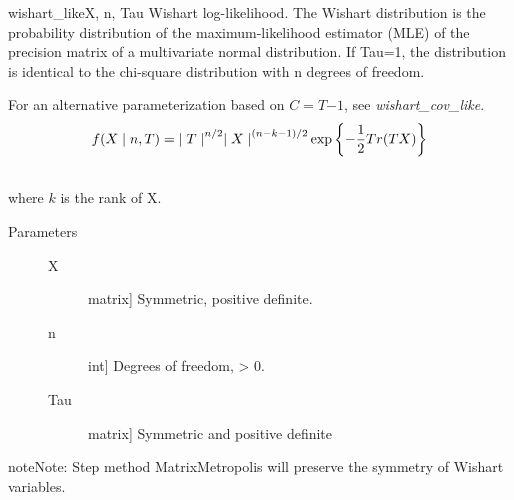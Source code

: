 \hypertarget{pymc.distributions.wishart_like}{}\begin{funcdesc}{wishart\_like}{X, n, Tau}
Wishart log-likelihood. The Wishart distribution is the probability
distribution of the maximum-likelihood estimator (MLE) of the precision
matrix of a multivariate normal distribution. If Tau=1, the distribution
is identical to the chi-square distribution with n degrees of freedom.

For an alternative parameterization based on $C=T{-1}$, see
\emph{wishart\_cov\_like}.
\begin{gather}
\begin{split}f(X \mid n, T) = {\mid T \mid}^{n/2}{\mid X \mid}^{(n-k-1)/2} \exp\left\{ -\frac{1}{2} Tr(TX) \right\}\end{split}\notag\\\begin{split}\end{split}\notag
\end{gather}
where $k$ is the rank of X.
\begin{description}
\item[Parameters] \leavevmode\begin{description}
\item[X] \leavevmode{[}matrix{]}
Symmetric, positive definite.

\item[n] \leavevmode{[}int{]}
Degrees of freedom, \textgreater{} 0.

\item[Tau] \leavevmode{[}matrix{]}
Symmetric and positive definite

\end{description}

\end{description}

\begin{notice}{note}{Note:}
Step method MatrixMetropolis will preserve the symmetry of Wishart variables.
\end{notice}
\end{funcdesc}

